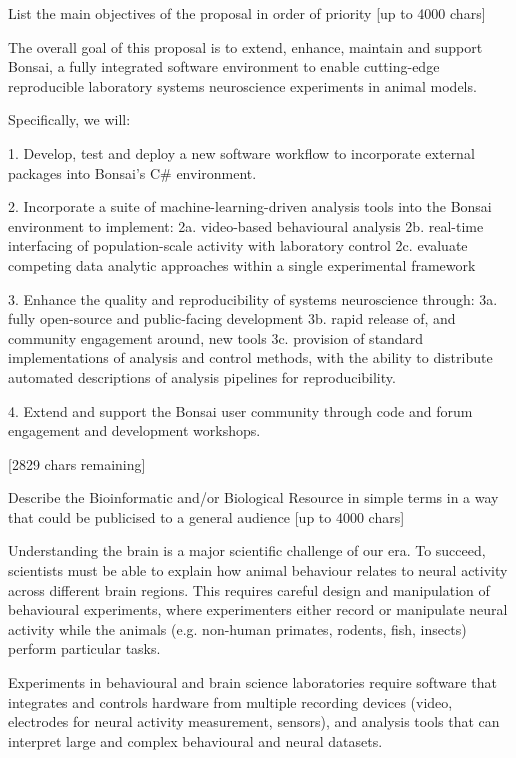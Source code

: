 
List the main objectives of the proposal in order of priority [up to
  4000 chars]

The overall goal of this proposal is to extend, enhance, maintain and support Bonsai, a fully integrated software
environment to enable cutting-edge reproducible laboratory systems neuroscience experiments in animal models.

Specifically, we will:

1. Develop, test and deploy a new software workflow to incorporate external packages into Bonsai's C# environment.

2. Incorporate a suite of machine-learning-driven analysis tools into the Bonsai environment to implement:
2a. video-based  behavioural analysis
2b. real-time interfacing of population-scale activity with laboratory control  
2c. evaluate competing data analytic approaches within a single experimental framework

3. Enhance the quality and reproducibility of systems neuroscience through:
3a. fully open-source and public-facing development
3b. rapid release of, and community engagement around, new tools
3c. provision of standard implementations of analysis and control methods, with the ability to distribute automated
descriptions of analysis pipelines for reproducibility.

4. Extend and support the Bonsai user community through code and forum engagement and development workshops.

[2829 chars remaining]




Describe the Bioinformatic and/or Biological Resource in simple terms in a way that could be publicised to a general audience [up to 4000 chars]

Understanding the brain is a major scientific challenge of our era. To succeed, scientists must be able to explain how animal behaviour relates to neural activity across different brain regions. This requires careful design and manipulation of behavioural experiments, where experimenters either record or manipulate neural activity while the animals (e.g. non-human primates, rodents, fish, insects) perform particular tasks. 

Experiments in behavioural and brain science laboratories require software that integrates and controls hardware from multiple recording devices (video, electrodes for neural activity measurement, sensors), and analysis tools that can interpret large and complex behavioural and neural datasets. 

